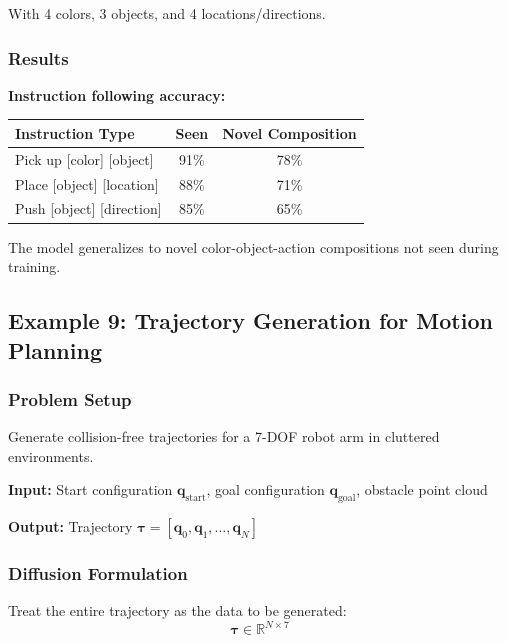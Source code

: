 With 4 colors, 3 objects, and 4 locations/directions.

\subsubsection{Results}

\textbf{Instruction following accuracy:}
\begin{center}
\begin{tabular}{lcc}
\toprule
\textbf{Instruction Type} & \textbf{Seen} & \textbf{Novel Composition} \\
\midrule
Pick up [color] [object] & 91\% & 78\% \\
Place [object] [location] & 88\% & 71\% \\
Push [object] [direction] & 85\% & 65\% \\
\bottomrule
\end{tabular}
\end{center}

The model generalizes to novel color-object-action compositions not seen during training.

\subsection{Example 9: Trajectory Generation for Motion Planning}
\label{subsec:example_trajectory_generation}

\subsubsection{Problem Setup}

Generate collision-free trajectories for a 7-DOF robot arm in cluttered environments.

\textbf{Input:} Start configuration $\mathbf{q}_{\text{start}}$, goal configuration $\mathbf{q}_{\text{goal}}$, obstacle point cloud

\textbf{Output:} Trajectory $\boldsymbol{\tau} = [\mathbf{q}_0, \mathbf{q}_1, \ldots, \mathbf{q}_N]$

\subsubsection{Diffusion Formulation}

Treat the entire trajectory as the data to be generated:
\begin{equation}
\boldsymbol{\tau} \in \mathbb{R}^{N \times 7}
\label{eq:trajectory_data}
\end{equation}

